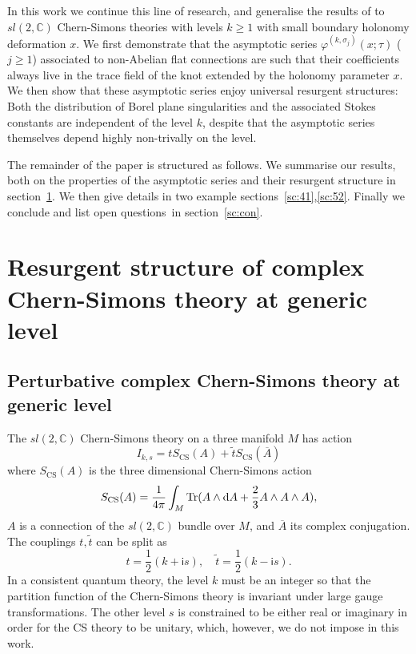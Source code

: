 \documentclass[a4paper,11pt]{article}	%
\DeclareMathOperator{\Tr}{Tr}
\def\IC{\mathbb{C}}
\newcommand{\ri}{{\mathsf{i}}}
\newcommand{\rd}{{\rm d}}
\newcommand{\s}{\sigma}
\def\jjj#1{$\spadesuit\spadesuit$ \emph{\textcolor{red}{#1}}
  $\spadesuit\spadesuit$}
\begin{document}
In this work we continue this line of research, and generalise the
results of \cite{Garoufalidis:2020xec,Garoufalidis:2020nut} to
$sl(2,\IC)$ Chern-Simons theories with levels $k\geq 1$ with small
boundary holonomy deformation $x$.
We first demonstrate that the asymptotic series $\varphi^{(k,\s_j)}(x;\tau)$
($j\geq 1$) associated to non-Abelian flat connections are such that
their coefficients always live in the trace field of the knot extended
by the holonomy parameter $x$.
We then show that these asymptotic series enjoy universal resurgent
structures:
Both the distribution of Borel plane singularities and the associated
Stokes constants are independent of the level $k$, despite that the
asymptotic series themselves depend highly non-trivally on the level.

The remainder of the paper is structured as follows.  We summarise our
results, both on the properties of the asymptotic series and their
resurgent structure in section~\ref{sc:resurg}.  We then give details
in two example sections~\ref{sc:41},\ref{sc:52}.  Finally we conclude
and list open questions\ in section~\ref{sc:con}.



\section{Resurgent structure of complex Chern-Simons theory at generic
  level}
\label{sc:resurg}



\subsection{Perturbative complex Chern-Simons theory at generic level}

The $sl(2,\IC)$ Chern-Simons theory on a three manifold $M$ has action
\begin{equation}
  I_{k,s} = t S_{\text{CS}}(A) + \tilde{t} S_{\text{CS}}(\overline{A})
\end{equation}
where $S_{\text{CS}}(A)$ is the three dimensional Chern-Simons action
\begin{equation}
  S_{\text{CS}}(A) = \frac{1}{4\pi}\int_M \Tr (A\wedge\rd A + \frac{2}{3}A\wedge
  A\wedge A),
\end{equation}
$A$ is a connection of the $sl(2,\IC)$ bundle over $M$, and
$\overline{A}$ its complex conjugation.
%
The couplings $t,\tilde{t}$ can be split as
\begin{equation}
  t = \frac{1}{2}(k+\ri s),\quad \tilde{t} =\frac{1}{2}(k-\ri s).
\end{equation}
In a consistent quantum theory, the level $k$ must be an integer so
that the partition function of the Chern-Simons theory is invariant
under large gauge transformations.  The other level $s$ is constrained
to be either real or imaginary in order for the CS theory to be
unitary, which, however, we do not impose in this work.
\end{document}
